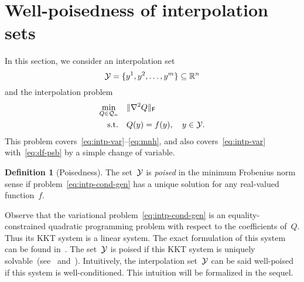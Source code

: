 \documentclass{article}
\numberwithin{equation}{section}
\theoremstyle{definition}
\newtheorem{definition}{Definition}[section]
\theoremstyle{plain}
\theoremstyle{remark}
\newcommand*{\norm}[2][]{#1\lVert#2#1\rVert}
\newcommand*{\obj}{f}
\newcommand*{\objm}[1][]{\hat{\obj}\ifblank{#1}{}{^{#1}}}
\newcommand*{\qpoly}{\mathcal{Q}_n}
\newcommand*{\R}{\mathbb{R}}
\newcommand*{\set}[2][]{#1\{#2#1\}}
\newcommand*{\xpt}[1][]{\mathcal{Y}\ifblank{#1}{}{^{#1}}}
\begin{document}
\section{Well-poisedness of interpolation sets}
\label{sec:well-poisedness}

In this section, we consider an interpolation set
\begin{equation*}
    \xpt = \set{y^1, y^2, \dots, y^m} \subseteq \R^n
\end{equation*}
and the interpolation problem
\begin{equation}
    \label{eq:intp-cond-gen}
    \begin{aligned}
        \min_{Q \in \qpoly} & \quad \norm{\nabla^2 Q}_\textsf{F}\\
        \text{s.t.}         & \quad Q(y) = \obj(y), \quad y \in \xpt.
    \end{aligned}
\end{equation}
This problem covers~\eqref{eq:intp-var}--\eqref{eq:mnh}, and also covers~\eqref{eq:intp-var} with~\eqref{eq:df-psb} by a simple change of variable.


\begin{definition}[Poisedness]
    The set~$\xpt$ is \emph{poised} in the minimum Frobenius norm sense if problem~\eqref{eq:intp-cond-gen} has a unique solution for any real-valued function~$\obj$.
\end{definition}

Observe that the variational problem~\eqref{eq:intp-cond-gen} is an equality-constrained quadratic
programming problem with respect to the coefficients of~$Q$. Thus its KKT system is a linear system.
The exact formulation of this system can be found in~\cite{Powell_2004a,Powell_2004b}.
The set~$\xpt$ is poised if this KKT system is uniquely solvable~(see~\mbox{\cite[\S~2]{Powell_2004a}} and~\cite[\S~5.3]{Conn_Scheinberg_Vicente_2009}).
Intuitively, the interpolation set~$\xpt$ can be said well-poised if this system is well-conditioned.
This intuition will be formalized in the sequel.
\end{document}
